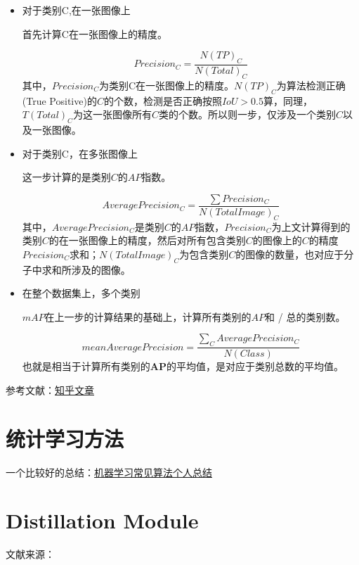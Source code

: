 \begin{itemize}
\item 对于类别C,在一张图像上

首先计算C在一张图像上的精度。

\begin{displaymath}
\label{PrecisionC1}
Precision_C = \frac{N(TP)_C}{N(Total)_C}
\end{displaymath}
其中，$Precision_C$为类别C在一张图像上的精度。$N(TP)_C$为算法检测正确(True Positive)的$C$的个数，检测是否正确按照$IoU > 0.5$算，同理，$T(Total)_C$为这一张图像所有$C$类的个数。所以则一步，仅涉及一个类别$C$以及一张图像。

\item 对于类别C，在多张图像上

这一步计算的是类别$C$的$AP$指数。

\begin{displaymath}
\label{PrecisionC2}
AveragePrecision_C = \frac{\sum Precision_C}{N(TotalImage)_C}
\end{displaymath}
其中，$AveragePrecision_C$是类别$C$的$AP$指数，$Precision_C$为上文计算得到的类别$C$的在一张图像上的精度，然后对所有包含类别$C$的图像上的$C$的精度$Precision_C$求和；$N(TotalImage)_C$为包含类别$C$的图像的数量，也对应于分子中求和所涉及的图像。

\item 在整个数据集上，多个类别

$mAP$在上一步的计算结果的基础上，计算所有类别的$AP$和 / 总的类别数。

\begin{displaymath}
\label{PrecisionC3}
meanAveragePrecision = \frac{\sum_{C} AveragePrecision_C}{N(Class)}
\end{displaymath}
也就是相当于计算所有类别的$\mathbf{AP}$的平均值，是对应于类别总数的平均值。

\end{itemize}

参考文献：\href{https://www.zhihu.com/question/53405779}{知乎文章}

\section{统计学习方法}

一个比较好的总结：\href{http://kubicode.me/2015/08/16/Machine%20Learning/Algorithm-Summary-for-Interview/#SVM%E3%80%81SMO}{机器学习常见算法个人总结}


\section{Distillation Module}
文献来源：\cite{Xu2018PADNet}\cite{Mehta2018OD200}

